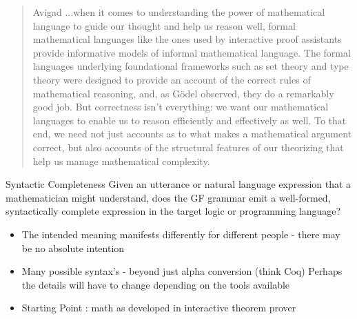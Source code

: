 \documentclass[10pt]{beamer}
\begin{document}
\begin{frame}
\begin{quote}{Avigad}
...when it comes to understanding the power of mathematical language to guide
our thought and help us reason well, formal mathematical languages like the ones
used by interactive proof assistants provide informative models of informal
mathematical language. The formal languages underlying foundational frameworks
such as set theory and type theory were designed to provide an account of the
correct rules of mathematical reasoning, and, as Gödel observed, they do a
remarkably good job. But correctness isn’t everything: we want our mathematical
languages to enable us to reason efficiently and effectively as well. To that
end, we need not just accounts as to what makes a mathematical argument correct,
but also accounts of the structural features of our theorizing that help us
manage mathematical complexity.
\end{quote}
\end{frame}

\begin{frame}
\begin{block}{Syntactic Completeness}
Given an utterance or natural language expression that a mathematician might
understand, does the GF grammar emit a well-formed, syntactically complete
expression in the target logic or programming language?
\end{block}

\begin{itemize}

\item The intended meaning manifests differently for different people - there
  may be no absolute intention
\item Many possible syntax's - beyond just alpha conversion (think Coq) Perhaps the details will have to change depending on the tools available
\item Starting Point : math as developed in interactive theorem prover

\end{itemize}

\end{frame}
\end{document}
